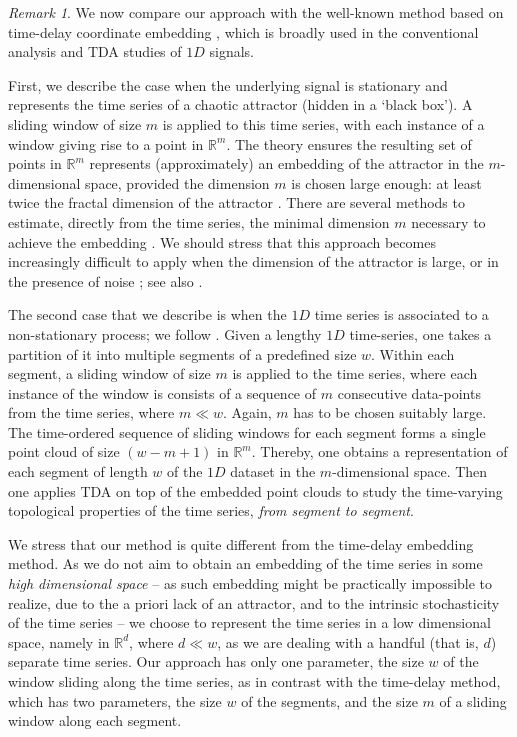 \documentclass[preprint,12pt]{elsarticle}
\theoremstyle{definition}
\theoremstyle{remark}
\newtheorem{remark}[thm]{Remark}
\numberwithin{equation}{section}
\theoremstyle{definition}
\begin{document}
\begin{remark} We now compare our approach with the well-known method based on time-delay coordinate embedding \cite{Takens}, which is broadly used in the conventional analysis and TDA studies of $1D$ signals.

First, we describe the  case when the underlying signal is stationary and represents the time series of a chaotic attractor (hidden in a `black box'). A sliding window of size $m$ is applied to this time series, with each instance of a window giving rise to a point in $\mathbb{R}^m$. The theory ensures the resulting set of points in $\mathbb{R}^m$ represents  (approximately) an embedding of the attractor in the $m$-dimensional space, provided the dimension $m$ is chosen large enough: at least twice the fractal dimension of the attractor \cite{Sauer}.  There are several methods to estimate, directly from the time series, the minimal dimension $m$ necessary to achieve the embedding \cite{Abarbanel,Packard}. We should stress that this approach becomes increasingly difficult to apply when the dimension of the attractor is large, or in the presence of noise \cite{Muldoon}; see also   \cite{Mischaikow97}.

The second case that we describe is when the $1D$ time series is associated to a non-stationary process; we follow \cite{Seversky16}. Given a lengthy $1D$ time-series,  one  takes a partition of  it into multiple segments of a predefined size $w$. Within each segment, a sliding window of size $m$ is applied to the time series, where each instance of the window is consists of a sequence of $m$ consecutive data-points from the time series, where $m\ll w$.
Again, $m$ has to be chosen suitably large. The time-ordered sequence of sliding windows for each segment forms a single point cloud of size $(w-m+1)$ in $\mathbb{R}^m$. Thereby, one obtains a representation of each segment of length $w$ of the $1D$ dataset in the $m$-dimensional space. Then one applies TDA   on top of the embedded point clouds to study the time-varying topological properties of the time series, \emph{from segment to segment}.

We stress that our method is quite different from the time-delay embedding method. As we do not aim to obtain an embedding of the time series in some \emph{high dimensional space} -- as such embedding might be practically impossible to realize, due to the a priori lack of an attractor, and to the intrinsic stochasticity of the time series -- we choose to represent the time series in a low dimensional space, namely in $\mathbb{R}^d$, where $d \ll w$, as we are dealing with a handful (that is, $d$) separate time series. Our approach has only one parameter, the size $w$ of the window sliding along the time series, as in contrast with the time-delay method, which has two parameters, the size $w$ of the segments, and the size $m$ of a sliding window along each segment.


\end{remark}
\end{document}
